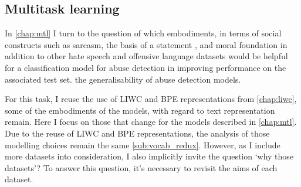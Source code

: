 \subsection{Multitask learning}\label{sub:mtl}

{\color{orange!80!black}
In \autoref{chap:mtl} I turn to the question of which embodiments, in terms of social constructs such as sarcasm\citep{Oraby:2016}, the basis of a statement \citep{Oraby:2015}, and moral foundation \citep{Hoover:2019} in addition to other hate speech and offensive language datasets \citep{Waseem:2016,Waseem-Hovy:2016,Davidson:2017,Wulczyn:2016} would be helpful for a classification model for abuse detection in improving performance
on the associated test set.
the generalisability of abuse detection models.

For this task,  I reuse the use of LIWC and BPE representations from \autoref{chap:liwc}, some of the embodiments of the models, with regard to text representation remain. Here I focus on those that change for the models described in \autoref{chap:mtl}. Due to the reuse of LIWC and BPE representations, the analysis of those modelling choices remain the same \autoref{sub:vocab_redux}. However, as I include more datasets into consideration, I also implicitly invite the question `why those datasets'? To answer this question, it's necessary to revisit the aims of each dataset.

}
